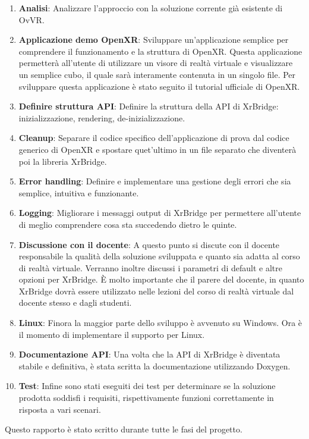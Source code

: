 \documentclass[twoside]{supsistudent}
\begin{document}
\begin{enumerate}
  \item \textbf{Analisi}: Analizzare l'approccio con la soluzione corrente già esistente di OvVR.
  \item \textbf{Applicazione demo OpenXR}: Sviluppare un'applicazione semplice per comprendere il funzionamento e la struttura di OpenXR. Questa applicazione permetterà all'utente di utilizzare un visore di realtà virtuale e visualizzare un semplice cubo, il quale sarà interamente contenuta in un singolo file. Per sviluppare questa applicazione è stato seguito il tutorial ufficiale di OpenXR.
  \item \textbf{Definire struttura API}: Definire la struttura della API di XrBridge: inizializzazione, rendering, de-inizializzazione.
  \item \textbf{Cleanup}: Separare il codice specifico dell'applicazione di prova dal codice generico di OpenXR e spostare quet'ultimo in un file separato che diventerà poi la libreria XrBridge.
  \item \textbf{Error handling}: Definire e implementare una gestione degli errori che sia semplice, intuitiva e funzionante.
  \item \textbf{Logging}: Migliorare i messaggi output di XrBridge per permettere all'utente di meglio comprendere cosa sta succedendo dietro le quinte.
  \item \textbf{Discussione con il docente}: A questo punto si discute con il docente responsabile la qualità della soluzione sviluppata e quanto sia adatta al corso di realtà virtuale. Verranno inoltre discussi i parametri di default e altre opzioni per XrBridge. È molto importante che il parere del docente, in quanto XrBridge dovrà essere utilizzato nelle lezioni del corso di realtà virtuale dal docente stesso e dagli studenti.
  \item \textbf{Linux}: Finora la maggior parte dello sviluppo è avvenuto su Windows. Ora è il momento di implementare il supporto per Linux.
  \item \textbf{Documentazione API}: Una volta che la API di XrBridge è diventata stabile e definitiva, è stata scritta la documentazione utilizzando Doxygen.
  \item \textbf{Test}: Infine sono stati eseguiti dei test per determinare se la soluzione prodotta soddisfi i requisiti, rispettivamente funzioni correttamente in risposta a vari scenari.
\end{enumerate}

Questo rapporto è stato scritto durante tutte le fasi del progetto.
\end{document}
